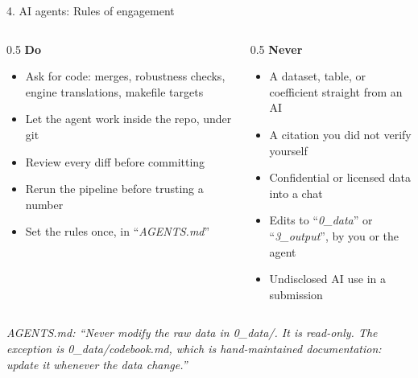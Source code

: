 \documentclass[
  ignorenonframetext,
  aspectratio=169,
]{beamer}
\providecommand{\tightlist}{%
  \setlength{\itemsep}{0pt}\setlength{\parskip}{0pt}}
\newcommand{\agentrule}[1]{%
  \vfill
  {\usebeamerfont{footnote}\itshape\textcolor{whu_anthracite}{AGENTS.md: ``#1''}}%
}
\begin{document}
\begin{frame}{4. AI agents: Rules of engagement}
\label{ai-agents-rules-of-engagement}
\begin{columns}[T]
\begin{column}{0.5\linewidth}
\textbf{Do}

\begin{itemize}
\tightlist
\item
  Ask for code: merges, robustness checks, engine translations, makefile
  targets
\item
  Let the agent work inside the repo, under git
\item
  Review every diff before committing
\item
  Rerun the pipeline before trusting a number
\item
  Set the rules once, in ``\emph{AGENTS.md}''
\end{itemize}
\end{column}

\begin{column}{0.5\linewidth}
\textbf{Never}

\begin{itemize}
\tightlist
\item
  A dataset, table, or coefficient straight from an AI
\item
  A citation you did not verify yourself
\item
  Confidential or licensed data into a chat
\item
  Edits to ``\emph{0\_data}'' or ``\emph{3\_output}'', by you or the
  agent
\item
  Undisclosed AI use in a submission
\end{itemize}
\end{column}
\end{columns}

\agentrule{Never modify the raw data in 0\_data/. It is read-only. The exception is 0\_data/codebook.md, which is hand-maintained documentation: update it whenever the data change.}


\end{frame}
\end{document}
